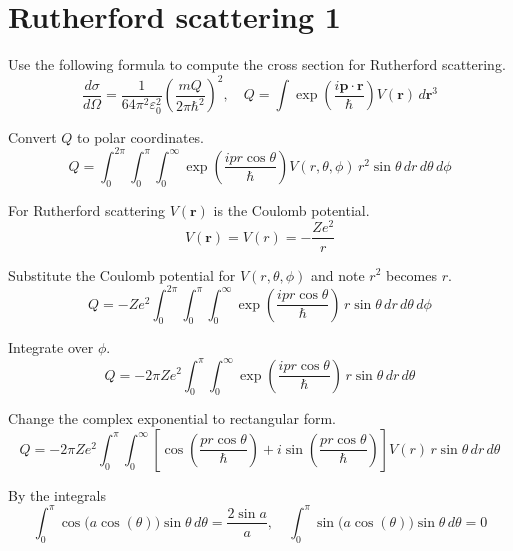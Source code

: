 


\section*{Rutherford scattering 1}

Use the following formula to compute the cross section for Rutherford scattering.
\begin{equation*}
\frac{d\sigma}{d\Omega}=\frac{1}{64\pi^2\varepsilon_0^2}\left(\frac{mQ}{2\pi\hbar^2}\right)^2,\quad
Q=\int\exp\left(\frac{i\mathbf p\cdot\mathbf r}{\hbar}\right)V(\mathbf r)\,d\mathbf r^3
\end{equation*}

Convert $Q$ to polar coordinates.
\begin{equation*}
Q=\int_0^{2\pi}
\int_0^\pi
\int_0^\infty
\exp\left(\frac{ipr\cos\theta}{\hbar}\right)V(r,\theta,\phi)
\,r^2\sin\theta\,dr\,d\theta\,d\phi
\end{equation*}

For Rutherford scattering $V(\mathbf r)$ is the Coulomb potential.
\begin{equation*}
V(\mathbf r)=V(r)=-\frac{Ze^2}{r}
\end{equation*}

Substitute the Coulomb potential for $V(r,\theta,\phi)$ and note $r^2$ becomes $r$.
\begin{equation*}
Q=-Ze^2
\int_0^{2\pi}
\int_0^\pi
\int_0^\infty
\exp\left(\frac{ipr\cos\theta}{\hbar}\right)
\,r\sin\theta\,dr\,d\theta\,d\phi
\end{equation*}

Integrate over $\phi$.
\begin{equation*}
Q=-2\pi Ze^2
\int_0^\pi
\int_0^\infty
\exp\left(\frac{ipr\cos\theta}{\hbar}\right)
\,r\sin\theta\,dr\,d\theta
\end{equation*}

Change the complex exponential to rectangular form.
\begin{equation*}
Q=-2\pi Ze^2
\int_0^\pi
\int_0^\infty
\left[
\cos\left(\frac{pr\cos\theta}{\hbar}\right)
+i\sin\left(\frac{pr\cos\theta}{\hbar}\right)
\right]
V(r)\,r\sin\theta\,dr\,d\theta
\end{equation*}

By the integrals
\begin{equation*}
\int_0^\pi\cos\bigl(a\cos(\theta)\bigr)\sin\theta\,d\theta=\frac{2\sin a}{a},\quad
\int_0^\pi\sin\bigl(a\cos(\theta)\bigr)\sin\theta\,d\theta=0
\end{equation*}

